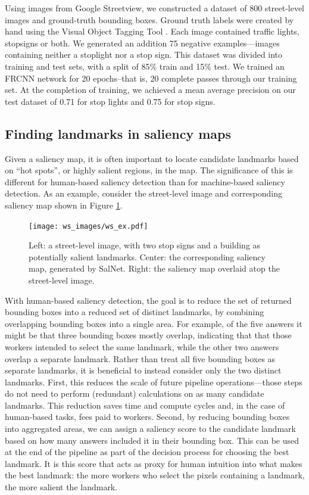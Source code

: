Using images from Google Streetview, we constructed a dataset of 800 street-level images and ground-truth bounding boxes. Ground truth labels were created by hand using the Visual Object Tagging Tool \cite{vott}. Each image contained traffic lights, stopsigns or both. We generated an addition 75 negative examples---images containing neither a stoplight nor a stop sign. This dataset was divided into training and test sets, with a split of 85\% train and 15\% test. We trained an FRCNN network for 20 epochs--that is, 20 complete passes through our training set. At the completion of training, we achieved a mean average precision on our test dataset of 0.71 for stop lights and 0.75 for stop signs.

\subsection{Finding landmarks in saliency maps}\label{Sect:watershed}
Given a saliency map, it is often important to locate candidate landmarks based on “hot spots”, or highly salient regions, in the map. The significance of this is different for human-based saliency detection than for machine-based saliency detection. As an example, consider the street-level image and corresponding saliency map shown in Figure \ref{fig:ws:ex}.

\begin{figure}[htbp]
  \centering
  \texttt{[image: ws\_images/ws\_ex.pdf]}
  \caption{Left: a street-level image, with two stop signs and a building as potentially salient landmarks. Center: the corresponding saliency map, generated by SalNet. Right: the saliency map overlaid atop the street-level image.}
  \label{fig:ws:ex}
\end{figure}

With human-based saliency detection, the goal is to reduce the set of returned bounding boxes into a reduced set of distinct landmarks, by combining overlapping bounding boxes into a single area. For example, of the five answers it might be that three bounding boxes mostly overlap, indicating that that those workers intended to select the same landmark, while the other two answers overlap a separate landmark. Rather than treat all five bounding boxes as separate landmarks, it is beneficial to instead consider only the two distinct landmarks. First, this reduces the scale of future pipeline operations---those steps do not need to perform (redundant) calculations on as many candidate landmarks. This reduction saves time and compute cycles and, in the case of human-based tasks, fees paid to workers. Second, by reducing bounding boxes into aggregated areas, we can assign a saliency score to the candidate landmark based on how many answers included it in their bounding box. This can be used at the end of the pipeline as part of the decision process for choosing the best landmark. It is this score that acts as proxy for human intuition into what makes the best landmark: the more workers who select the pixels containing a landmark, the more salient the landmark.


